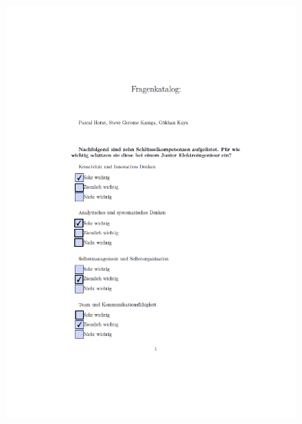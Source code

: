  
\begin{figure}[ht]
 	\centering
	\includegraphics[width=1.3\textwidth]{images/Sandro1.png}
 	\label{fig:fragsan1}
\end{figure}

